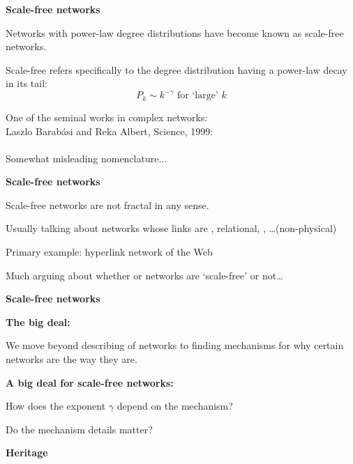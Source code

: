 \begin{frame}[label=]
 \textbf{Scale-free networks}
 
 
  
   Networks with power-law degree distributions
   have become known as \alert{scale-free} networks.
 
   Scale-free refers specifically to the \alert{degree distribution}
   having a \alert{power-law decay} in its tail:
   $$
   {
     P_k \sim k^{-\gamma} 
     \mbox{\ for `large' $k$}
   }
   $$
 
   One of the seminal works in complex networks:\\
   Laszlo Barab\'{a}si and Reka Albert, Science, 1999:\\
   \cite{barabasi1999a}\\
 
   Somewhat misleading nomenclature...
 


\begin{frame}[label=]
  \textbf{Scale-free networks}

  
  
    Scale-free networks are \alert{not fractal} in any sense.
  
    Usually talking about networks whose links are
    , 
    \alert{relational}, 
    , 
    \ldots (non-physical)
  
    Primary example: hyperlink network of the Web
  
    Much arguing about whether or networks are `scale-free' or not\ldots
  




\begin{frame}[label=]
 \textbf{Scale-free networks}

 \textbf{The big deal:}
   
   
     We move beyond describing of networks
     to finding \alert{mechanisms} for why
     certain networks are the way they are.
   
 

 \textbf{A big deal for scale-free networks:}
   
   
     How does the exponent $\gamma$ depend on the mechanism?
   
     Do the mechanism details matter?
   
 
 

  \textbf{Heritage}


\end{frame}
\end{frame}
\end{frame}
